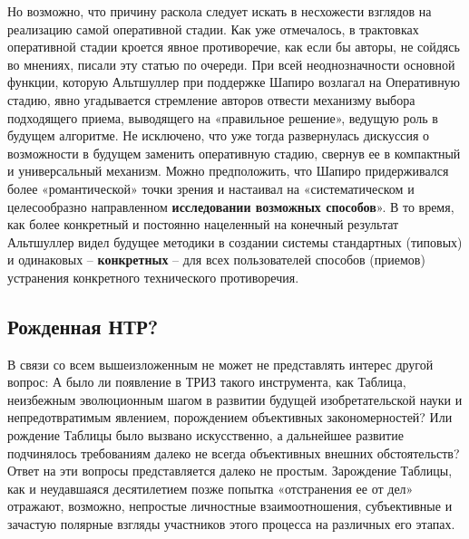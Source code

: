 \documentclass[11pt,a4paper]{article}
\begin{document}
Но возможно, что причину раскола следует искать в несхожести взглядов на
реализацию самой оперативной стадии. Как уже отмечалось, в трактовках
оперативной стадии кроется явное противоречие, как если бы авторы, не сойдясь
во мнениях, писали эту статью по очереди. При всей неоднозначности основной
функции, которую Альтшуллер при поддержке Шапиро возлагал на Оперативную
стадию, явно угадывается стремление авторов отвести механизму выбора
подходящего приема, выводящего на «правильное решение», ведущую роль в будущем
алгоритме. Не исключено, что уже тогда развернулась дискуссия о возможности в
будущем заменить оперативную стадию, свернув ее в компактный и универсальный
механизм. Можно предположить, что Шапиро придерживался более «романтической»
точки зрения и настаивал на «систематическом и целесообразно направленном
\textbf{исследовании возможных способов}». В то время, как более конкретный и
постоянно нацеленный на конечный результат Альтшуллер видел будущее методики в
создании системы стандартных (типовых) и одинаковых -- \textbf{конкретных} --
для всех пользователей способов (приемов) устранения конкретного технического
противоречия.

\subsection*{Рожденная НТР?}

В связи со всем вышеизложенным не может не представлять интерес другой вопрос:
А было ли появление в ТРИЗ такого инструмента, как Таблица, неизбежным
эволюционным шагом в развитии будущей изобретательской науки и
непредотвратимым явлением, порождением объективных закономерностей? Или
рождение Таблицы было вызвано искусственно, а дальнейшее развитие подчинялось
требованиям далеко не всегда объективных внешних обстоятельств? Ответ на эти
вопросы представляется далеко не простым. Зарождение Таблицы, как и
неудавшаяся десятилетием позже попытка «отстранения ее от дел» отражают,
возможно, непростые личностные взаимоотношения, субъективные и зачастую
полярные взгляды участников этого процесса на различных его этапах.
\end{document}

